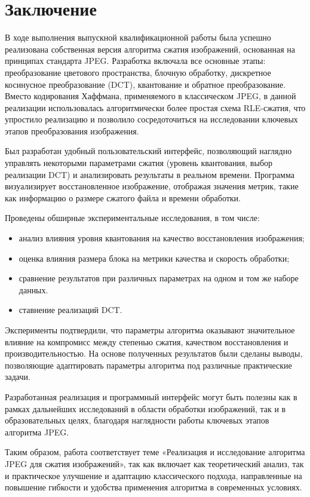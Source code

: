 \section{Заключение}

В ходе выполнения выпускной квалификационной работы была успешно реализована собственная версия алгоритма 
сжатия изображений, основанная на принципах стандарта JPEG. 
Разработка включала все основные этапы: преобразование цветового пространства, 
блочную обработку, дискретное косинусное преобразование (DCT), квантование и обратное преобразование. 
Вместо кодирования Хаффмана, применяемого в классическом JPEG, 
в данной реализации использовалась алгоритмически более простая схема RLE-сжатия, 
что упростило реализацию и позволило сосредоточиться на исследовании ключевых этапов преобразования изображения.

Был разработан удобный пользовательский интерфейс, позволяющий наглядно управлять некоторыми параметрами 
сжатия (уровень квантования, выбор реализации DCT) и анализировать результаты в реальном времени. 
Программа визуализирует восстановленное изображение, отображая значения метрик, 
такие как информацию о размере сжатого файла и времени обработки.

Проведены обширные экспериментальные исследования, в том числе:

\begin{itemize}
    \item анализ влияния уровня квантования на качество восстановления изображения;
    \item оценка влияния размера блока на метрики качества и скорость обработки;
    \item сравнение результатов при различных параметрах на одном и том же наборе данных.
    \item ставнение реализаций DCT.
\end{itemize}

Эксперименты подтвердили, что параметры алгоритма оказывают значительное влияние 
на компромисс между степенью сжатия, качеством восстановления и производительностью. 
На основе полученных результатов были сделаны выводы, позволяющие адаптировать параметры алгоритма 
под различные практические задачи.

Разработанная реализация и программный интерфейс могут быть полезны как в рамках дальнейших исследований 
в области обработки изображений, так и в образовательных целях, 
благодаря наглядности работы ключевых этапов алгоритма JPEG.

Таким образом, работа соответствует теме «Реализация и исследование алгоритма JPEG для сжатия изображений», 
так как включает как теоретический анализ, так и практическое улучшение и адаптацию классического подхода, 
направленные на повышение гибкости и удобства применения алгоритма в современных условиях.